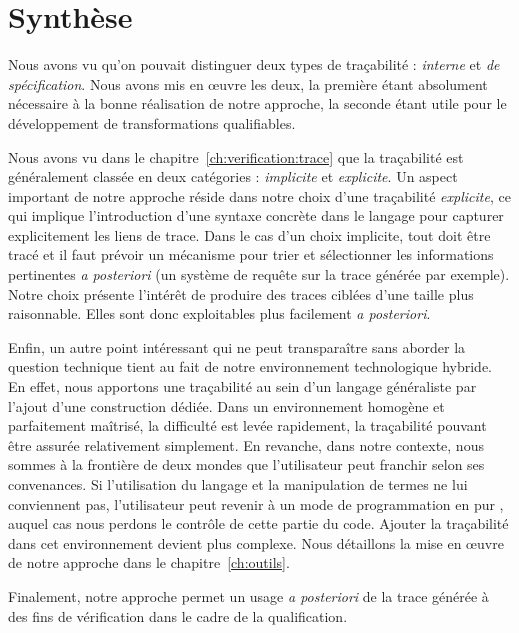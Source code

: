 \section{Synthèse}%

Nous avons vu qu'on pouvait distinguer deux types de traçabilité :
\emph{interne} et \emph{de spécification}. Nous avons mis en œuvre les deux, la
première étant absolument nécessaire à la bonne réalisation de notre approche,
la seconde étant utile pour le développement de transformations qualifiables.

Nous avons vu dans le chapitre~\ref{ch:verification:trace} que la traçabilité
est généralement classée en deux catégories : \emph{implicite} et
\emph{explicite}. Un aspect important de notre approche réside dans notre choix
d'une traçabilité \emph{explicite}, ce qui implique l'introduction d'une
syntaxe concrète dans le langage pour capturer explicitement les liens de
trace. Dans le cas d'un choix implicite, tout doit être tracé et il faut
prévoir un mécanisme pour trier et sélectionner les informations pertinentes
\emph{a posteriori} (un système de requête sur la trace générée par exemple).
Notre choix présente l'intérêt de produire des traces ciblées d'une taille plus
raisonnable. Elles sont donc exploitables plus facilement \emph{a posteriori}.

Enfin, un autre point intéressant qui ne peut transparaître sans aborder la
question technique tient au fait de notre environnement technologique  hybride.
En effet, nous apportons une traçabilité au sein d'un langage généraliste par
l'ajout d'une construction dédiée. Dans un environnement homogène et parfaitement maîtrisé, la
difficulté est levée rapidement, la traçabilité pouvant être assurée
relativement simplement. En revanche, dans notre contexte, nous sommes à la
frontière de deux mondes que l'utilisateur peut franchir selon ses convenances.
Si l'utilisation du langage {\tom} et la manipulation de termes ne lui
conviennent pas, l'utilisateur peut revenir à un mode de programmation en pur
{\java}, auquel cas nous perdons le contrôle de cette partie du code. Ajouter
la traçabilité dans cet environnement devient plus complexe. Nous détaillons la
mise en œuvre de notre approche dans le chapitre~\ref{ch:outils}.

Finalement, notre approche permet un usage \emph{a posteriori} de la trace
générée à des fins de vérification dans le cadre de la qualification.

